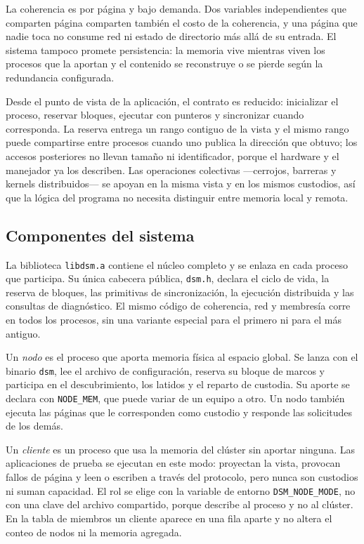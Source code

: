 La coherencia es por página y bajo demanda. Dos variables independientes que comparten página comparten también el costo de la coherencia, y una página que nadie toca no consume red ni estado de directorio más allá de su entrada. El sistema tampoco promete persistencia: la memoria vive mientras viven los procesos que la aportan y el contenido se reconstruye o se pierde según la redundancia configurada.

Desde el punto de vista de la aplicación, el contrato es reducido: inicializar el proceso, reservar bloques, ejecutar con punteros y sincronizar cuando corresponda. La reserva entrega un rango contiguo de la vista y el mismo rango puede compartirse entre procesos cuando uno publica la dirección que obtuvo; los accesos posteriores no llevan tamaño ni identificador, porque el hardware y el manejador ya los describen. Las operaciones colectivas —cerrojos, barreras y kernels distribuidos— se apoyan en la misma vista y en los mismos custodios, así que la lógica del programa no necesita distinguir entre memoria local y remota.

\subsection{Componentes del sistema}

La biblioteca \texttt{libdsm.a} contiene el núcleo completo y se enlaza en cada proceso que participa. Su única cabecera pública, \texttt{dsm.h}, declara el ciclo de vida, la reserva de bloques, las primitivas de sincronización, la ejecución distribuida y las consultas de diagnóstico. El mismo código de coherencia, red y membresía corre en todos los procesos, sin una variante especial para el primero ni para el más antiguo.

Un \emph{nodo} es el proceso que aporta memoria física al espacio global. Se lanza con el binario \texttt{dsm}, lee el archivo de configuración, reserva su bloque de marcos y participa en el descubrimiento, los latidos y el reparto de custodia. Su aporte se declara con \texttt{NODE\_MEM}, que puede variar de un equipo a otro. Un nodo también ejecuta las páginas que le corresponden como custodio y responde las solicitudes de los demás.

Un \emph{cliente} es un proceso que usa la memoria del clúster sin aportar ninguna. Las aplicaciones de prueba se ejecutan en este modo: proyectan la vista, provocan fallos de página y leen o escriben a través del protocolo, pero nunca son custodios ni suman capacidad. El rol se elige con la variable de entorno \texttt{DSM\_NODE\_MODE}, no con una clave del archivo compartido, porque describe al proceso y no al clúster. En la tabla de miembros un cliente aparece en una fila aparte y no altera el conteo de nodos ni la memoria agregada.

